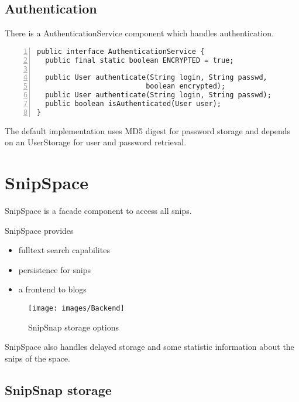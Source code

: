 \documentclass[a4paper,pdftex]{article}
\begin{document}
\subsection{Authentication}

There is a AuthenticationService component which handles authentication. 

\begin{Verbatim}[gobble=0,frame=single,numbers=left,fontsize=\small]
public interface AuthenticationService {
  public final static boolean ENCRYPTED = true;

  public User authenticate(String login, String passwd, 
                          boolean encrypted);
  public User authenticate(String login, String passwd);
  public boolean isAuthenticated(User user);
}
\end{Verbatim}

The default implementation uses MD5 digest for password storage and depends
on an UserStorage for user and password retrieval.

\section{SnipSpace}

SnipSpace is a facade component to access all snips.

SnipSpace provides
\begin{itemize}
\item fulltext search capabilites
\item persistence for snips
\item a frontend to blogs
\end{itemize}

\begin{figure}[ht]
  \centering
    \texttt{[image: images/Backend]}
     \caption{\small\textsf SnipSnap storage options}
     \label{Backend}
\end{figure}


SnipSpace also handles delayed storage and some statistic information about the 
snips of the space.

\subsection{SnipSnap storage}
\end{document}
